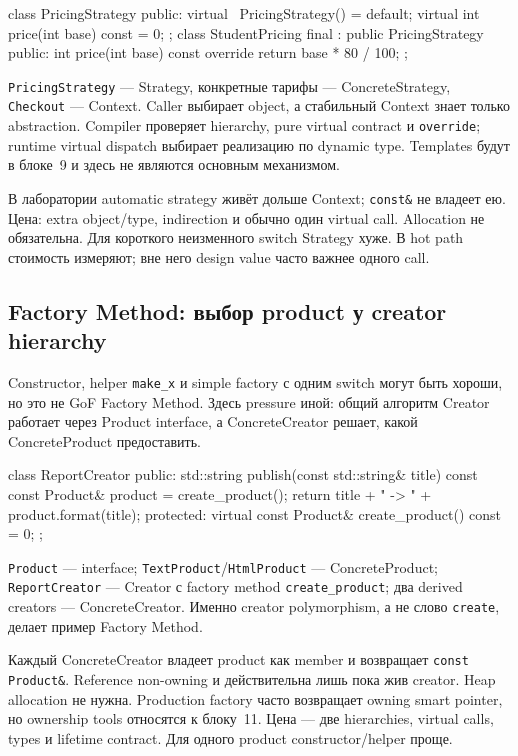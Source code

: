 \begin{cppcode}
class PricingStrategy {
public:
    virtual ~PricingStrategy() = default;
    virtual int price(int base) const = 0;
};
class StudentPricing final : public PricingStrategy {
public:
    int price(int base) const override { return base * 80 / 100; }
};
\end{cppcode}

\texttt{PricingStrategy} --- Strategy, конкретные тарифы ---
ConcreteStrategy, \texttt{Checkout} --- Context. Caller выбирает object, а
стабильный Context знает только abstraction. Compiler проверяет hierarchy,
pure virtual contract и \texttt{override}; runtime virtual dispatch выбирает
реализацию по dynamic type. Templates будут в блоке~9 и здесь не являются
основным механизмом.

В лаборатории automatic strategy живёт дольше Context; \texttt{const\&} не
владеет ею. Цена: extra object/type, indirection и обычно один virtual call.
Allocation не обязательна. Для короткого неизменного switch Strategy хуже.
В hot path стоимость измеряют; вне него design value часто важнее одного call.

\subsection{Factory Method: выбор product у creator hierarchy}

Constructor, helper \texttt{make\_x} и simple factory с одним switch могут
быть хороши, но это не GoF Factory Method. Здесь pressure иной: общий алгоритм
Creator работает через Product interface, а ConcreteCreator решает, какой
ConcreteProduct предоставить.

\begin{cppcode}
class ReportCreator {
public:
    std::string publish(const std::string& title) const {
        const Product& product = create_product();
        return title + " -> " + product.format(title);
    }
protected:
    virtual const Product& create_product() const = 0;
};
\end{cppcode}

\texttt{Product} --- interface; \texttt{TextProduct}/\texttt{HtmlProduct} ---
ConcreteProduct; \texttt{ReportCreator} --- Creator с factory method
\texttt{create\_product}; два derived creators --- ConcreteCreator. Именно
creator polymorphism, а не слово \texttt{create}, делает пример Factory Method.

Каждый ConcreteCreator владеет product как member и возвращает
\texttt{const Product\&}. Reference non-owning и действительна лишь пока жив
creator. Heap allocation не нужна. Production factory часто возвращает owning
smart pointer, но ownership tools относятся к блоку~11. Цена --- две
hierarchies, virtual calls, types и lifetime contract. Для одного product
constructor/helper проще.

